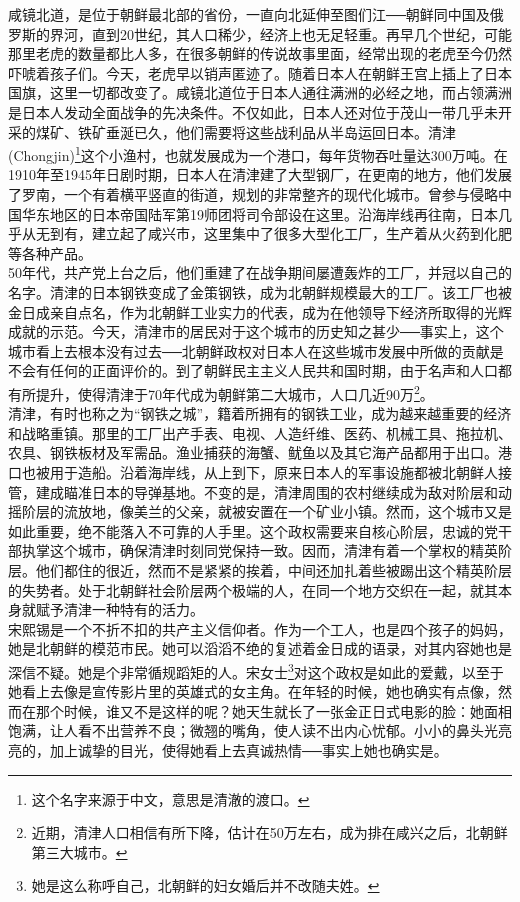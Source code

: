 咸镜北道，是位于朝鲜最北部的省份，一直向北延伸至图们江──朝鲜同中国及俄罗斯的界河，直到20世纪，其人口稀少，经济上也无足轻重。再早几个世纪，可能那里老虎的数量都比人多，在很多朝鲜的传说故事里面，经常出现的老虎至今仍然吓唬着孩子们。今天，老虎早以销声匿迹了。随着日本人在朝鲜王宫上插上了日本国旗，这里一切都改变了。咸镜北道位于日本人通往满洲的必经之地，而占领满洲是日本人发动全面战争的先决条件。不仅如此，日本人还对位于茂山一带几乎未开采的煤矿、铁矿垂涎已久，他们需要将这些战利品从半岛运回日本。清津(Chongjin)\footnote{这个名字来源于中文，意思是清澈的渡口。}这个小渔村，也就发展成为一个港口，每年货物吞吐量达300万吨。在1910年至1945年日剧时期，日本人在清津建了大型钢厂，在更南的地方，他们发展了罗南，一个有着横平竖直的街道，规划的非常整齐的现代化城市。曾参与侵略中国华东地区的日本帝国陆军第19师团将司令部设在这里。沿海岸线再往南，日本几乎从无到有，建立起了咸兴市，这里集中了很多大型化工厂，生产着从火药到化肥等各种产品。\\

50年代，共产党上台之后，他们重建了在战争期间屡遭轰炸的工厂，并冠以自己的名字。清津的日本钢铁变成了金策钢铁，成为北朝鲜规模最大的工厂。该工厂也被金日成亲自点名，作为北朝鲜工业实力的代表，成为在他领导下经济所取得的光辉成就的示范。今天，清津市的居民对于这个城市的历史知之甚少──事实上，这个城市看上去根本没有过去──北朝鲜政权对日本人在这些城市发展中所做的贡献是不会有任何的正面评价的。到了朝鲜民主主义人民共和国时期，由于名声和人口都有所提升，使得清津于70年代成为朝鲜第二大城市，人口几近90万\footnote{近期，清津人口相信有所下降，估计在50万左右，成为排在咸兴之后，北朝鲜第三大城市。}。\\

清津，有时也称之为“钢铁之城”，籍着所拥有的钢铁工业，成为越来越重要的经济和战略重镇。那里的工厂出产手表、电视、人造纤维、医药、机械工具、拖拉机、农具、钢铁板材及军需品。渔业捕获的海蟹、鱿鱼以及其它海产品都用于出口。港口也被用于造船。沿着海岸线，从上到下，原来日本人的军事设施都被北朝鲜人接管，建成瞄准日本的导弹基地。不变的是，清津周围的农村继续成为敌对阶层和动摇阶层的流放地，像美兰的父亲，就被安置在一个矿业小镇。然而，这个城市又是如此重要，绝不能落入不可靠的人手里。这个政权需要来自核心阶层，忠诚的党干部执掌这个城市，确保清津时刻同党保持一致。因而，清津有着一个掌权的精英阶层。他们都住的很近，然而不是紧紧的挨着，中间还加扎着些被踢出这个精英阶层的失势者。处于北朝鲜社会阶层两个极端的人，在同一个地方交织在一起，就其本身就赋予清津一种特有的活力。\\

宋熙锡是一个不折不扣的共产主义信仰者。作为一个工人，也是四个孩子的妈妈，她是北朝鲜的模范市民。她可以滔滔不绝的复述着金日成的语录，对其内容她也是深信不疑。她是个非常循规蹈矩的人。宋女士\footnote{她是这么称呼自己，北朝鲜的妇女婚后并不改随夫姓。}对这个政权是如此的爱戴，以至于她看上去像是宣传影片里的英雄式的女主角。在年轻的时候，她也确实有点像，然而在那个时候，谁又不是这样的呢？她天生就长了一张金正日式电影的脸：她面相饱满，让人看不出营养不良；微翘的嘴角，使人读不出内心忧郁。小小的鼻头光亮亮的，加上诚挚的目光，使得她看上去真诚热情──事实上她也确实是。\\

